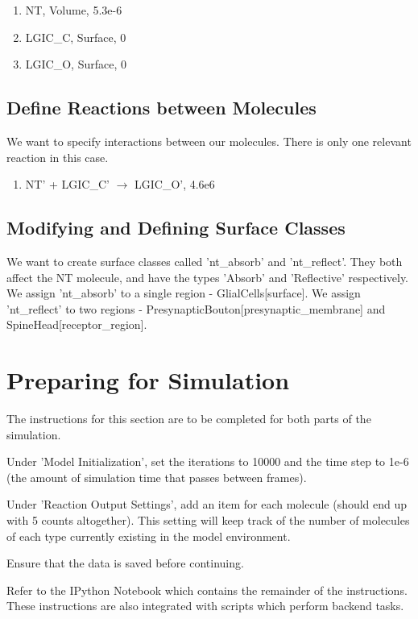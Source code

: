 \documentclass[twoside,a4paper]{refart}
\begin{document}
\begin{enumerate}
    \item NT, Volume, 5.3e-6
    \item LGIC\_C, Surface, 0
    \item LGIC\_O, Surface, 0
\end{enumerate} 

\subsection{Define Reactions between Molecules}
We want to specify interactions between our molecules. There is only one relevant reaction in this case.

\begin{enumerate}
    \item NT' + LGIC\_C' $\to$ LGIC\_O', 4.6e6
\end{enumerate}

\subsection{Modifying and Defining Surface Classes}
We want to create surface classes called 'nt\_absorb' and 'nt\_reflect'. They both affect the NT molecule, and have the types 'Absorb' and 'Reflective' respectively. We assign 'nt\_absorb' to a single region - GlialCells[surface]. We assign 'nt\_reflect' to two regions - PresynapticBouton[presynaptic\_membrane] and SpineHead[receptor\_region].

\section{Preparing for Simulation}
The instructions for this section are to be completed for both parts of the simulation.

Under 'Model Initialization', set the iterations to 10000 and the time step to 1e-6 (the amount of simulation time that passes between frames).

Under 'Reaction Output Settings', add an item for each molecule (should end up with 5 counts altogether). This setting will keep track of the number of molecules of each type currently existing in the model environment.

Ensure that the data is saved before continuing.

Refer to the IPython Notebook which contains the remainder of the instructions. These instructions are also integrated with scripts which perform backend tasks.
\end{document}
